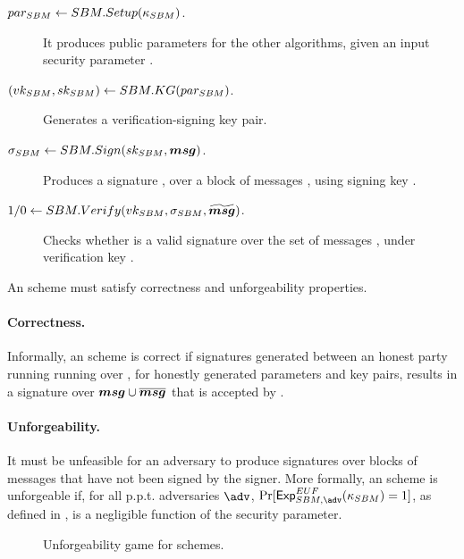 \begin{description}
\item[$par_{SBM} \gets SBM.Setup(\kappa_{SBM})$.] It produces public parameters
  for the other algorithms, given an input security parameter \SBMsecpar.
\item[$(vk_{SBM},sk_{SBM}) \gets SBM.KG(par_{SBM})$.] Generates a
  verification-signing key pair.
\item[$\sigma_{SBM} \gets SBM.Sign(sk_{SBM},\boldsymbol{msg})$.] Produces a signature \sig, over
  a block of messages \smsg, using signing key \SBMsk.
\item[$1/0 \gets SBM.Verify(vk_{SBM},\sigma_{SBM},\widetilde{\boldsymbol{msg}})$.] Checks
  whether \SBMsig is a valid signature over the set of messages \smsg, under
  verification key \SBMvk.
\end{description}

An \SBM scheme must satisfy correctness and unforgeability properties.

\paragraph{Correctness.} %
Informally, an \SBM scheme is correct if signatures generated between an honest
party running running \SBMSign over \smsg, for honestly generated parameters
and key pairs, results in a signature over $\boldsymbol{msg} \cup \overline{\boldsymbol{msg}}$ that is
accepted by \SBMVerify.

\paragraph{Unforgeability.} %
It must be unfeasible for an adversary to produce signatures over blocks of
messages that have not been signed by the signer. More formally, an \SBM scheme
is unforgeable if, for all p.p.t. adversaries $\adv$, $\Pr[\ExpSBMEUF
(\SBMsecpar) = 1]$, as defined in , is a negligible
function of the security parameter. 

\begin{figure}[ht!]
  \label{fig:sbm-games}
  \caption{Unforgeability game for \SBM schemes.}
\end{figure}
\fi


